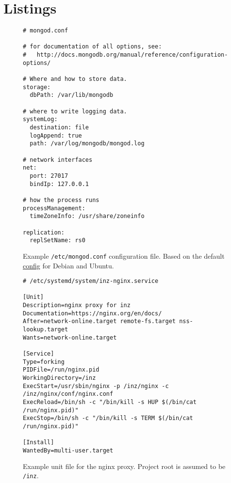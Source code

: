 \chapter{Listings}

\begin{figure}
	\centering
	\begin{verbatim}
# mongod.conf

# for documentation of all options, see:
#   http://docs.mongodb.org/manual/reference/configuration-options/

# Where and how to store data.
storage:
  dbPath: /var/lib/mongodb

# where to write logging data.
systemLog:
  destination: file
  logAppend: true
  path: /var/log/mongodb/mongod.log

# network interfaces
net:
  port: 27017
  bindIp: 127.0.0.1

# how the process runs
processManagement:
  timeZoneInfo: /usr/share/zoneinfo

replication:
  replSetName: rs0
	\end{verbatim}
	\caption{Example \texttt{/etc/mongod.conf} configuration file. Based on the default \href{https://github.com/mongodb/mongo/blob/e4fff3e1fe7b31b25cedde7b05205325b47b4a7d/debian/mongod.conf}{config} for Debian and Ubuntu.}
	\label{fig:example-mongod}
\end{figure}

\begin{figure}
	\centering
	\begin{verbatim}
# /etc/systemd/system/inz-nginx.service

[Unit]
Description=nginx proxy for inz
Documentation=https://nginx.org/en/docs/
After=network-online.target remote-fs.target nss-lookup.target
Wants=network-online.target

[Service]
Type=forking
PIDFile=/run/nginx.pid
WorkingDirectory=/inz
ExecStart=/usr/sbin/nginx -p /inz/nginx -c /inz/nginx/conf/nginx.conf
ExecReload=/bin/sh -c "/bin/kill -s HUP $(/bin/cat /run/nginx.pid)"
ExecStop=/bin/sh -c "/bin/kill -s TERM $(/bin/cat /run/nginx.pid)"

[Install]
WantedBy=multi-user.target
	\end{verbatim}
	\caption{Example unit file for the nginx proxy. Project root is assumed to be \texttt{/inz}.}
	\label{fig:example-nginx-service}
\end{figure}

